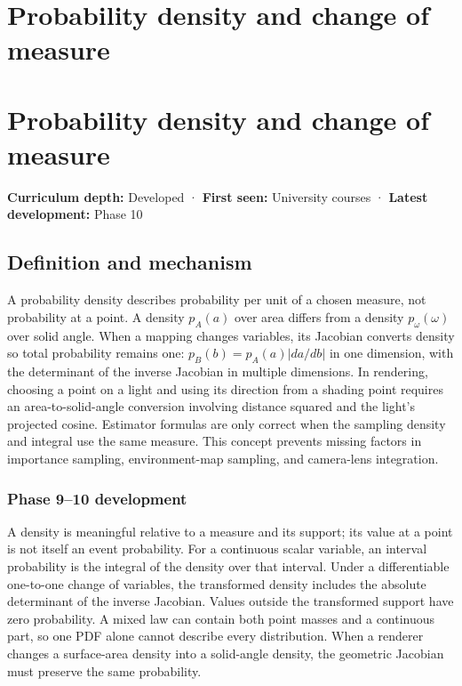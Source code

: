 \hypertarget{appendix-4815cd87ab8b}{}
\section*{Probability density and change of measure}
\section{Probability density and change of measure}\label{probability-density-and-change-of-measure}

\textbf{Curriculum depth:} Developed · \textbf{First seen:} University courses · \textbf{Latest development:} Phase 10

\subsection{Definition and mechanism}\label{definition-and-mechanism}

A probability density describes probability per unit of a chosen measure, not probability at a point. A density \(p_A(a)\) over area differs from a density \(p_\omega(\omega)\) over solid angle. When a mapping changes variables, its Jacobian converts density so total probability remains one: \(p_B(b)=p_A(a)|da/db|\) in one dimension, with the determinant of the inverse Jacobian in multiple dimensions. In rendering, choosing a point on a light and using its direction from a shading point requires an area-to-solid-angle conversion involving distance squared and the light's projected cosine. Estimator formulas are only correct when the sampling density and integral use the same measure. This concept prevents missing factors in importance sampling, environment-map sampling, and camera-lens integration.

\subsubsection{Phase 9--10 development}\label{phase-910-development}

A density is meaningful relative to a measure and its support; its value at a point is not itself an event probability. For a continuous scalar variable, an interval probability is the integral of the density over that interval. Under a differentiable one-to-one change of variables, the transformed density includes the absolute determinant of the inverse Jacobian. Values outside the transformed support have zero probability. A mixed law can contain both point masses and a continuous part, so one PDF alone cannot describe every distribution. When a renderer changes a surface-area density into a solid-angle density, the geometric Jacobian must preserve the same probability.

